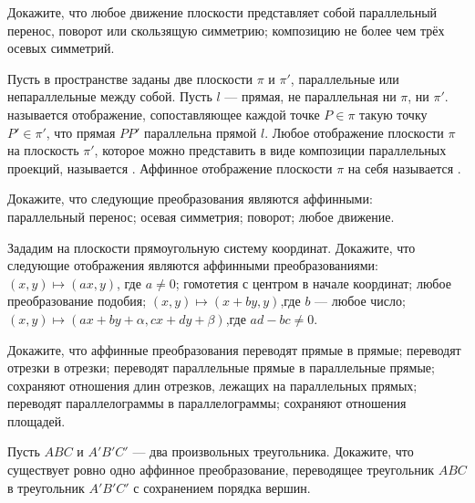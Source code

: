 \documentclass[12pt]{article}
\begin{document}



Докажите, что любое движение плоскости представляет собой
 параллельный перенос, поворот или скользящую симметрию;
 композицию не более чем трёх осевых симметрий.


Пусть в пространстве заданы две плоскости $\pi$ и $\pi'$, параллельные или непараллельные между собой. Пусть $l$ --- прямая, не параллельная ни $\pi$, ни $\pi'$.  называется отображение, сопоставляющее каждой точке $P\in\pi$ такую точку $P'\in\pi'$, что прямая $PP'$ параллельна прямой $l$. Любое отображение плоскости $\pi$ на плоскость $\pi'$, которое
можно представить в виде композиции параллельных проекций, называется . Аффинное отображение плоскости $\pi$ на себя называется .

Докажите, что следующие преобразования являются аффинными:\\
 параллельный перенос;
 осевая симметрия;
 поворот;
 любое движение.

Зададим на плоскости прямоугольную систему координат. Докажите, что следующие отображения являются аффинными преобразованиями:
 $(x,y)\mapsto(a x,y)$, где $a\ne0$;
 гомотетия с центром в начале координат;
 любое преобразование подобия;
 $(x,y)\mapsto(x + b y,y)$,\quad где $b$ --- любое число;
 $(x,y)\mapsto(ax + by + \alpha, cx + dy + \beta)$,\quad где $ad-bc\ne0$.

Докажите, что аффинные преобразования
 переводят прямые в прямые;
 переводят отрезки в отрезки;
 переводят параллельные прямые в параллельные прямые;
 сохраняют отношения длин отрезков, лежащих на параллельных прямых;
 переводят параллелограммы в параллелограммы;
 сохраняют отношения площадей. %

Пусть $ABC$ и $A'B'C'$ --- два произвольных треугольника. Докажите, что существует ровно одно аффинное преобразование, переводящее треугольник $ABC$ в треугольник $A'B'C'$ с сохранением порядка вершин.

\bigskip
{}
\end{document}
